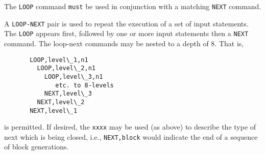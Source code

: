 \headb

The {\tt LOOP} command {\tt must} be used in conjunction
with a matching {\tt NEXT} command.

A {\tt LOOP-NEXT} pair is used to
repeat the execution of a set of input statements.  The {\tt LOOP}
appears first, followed by one or more input statements then
a {\tt NEXT} command.  The loop-next commands may be
nested to a depth of 8.  That is,
\begin{verbatim}
       LOOP,level\_1,n1
         LOOP,level\_2,n1
           LOOP,level\_3,n1
              etc. to 8-levels
           NEXT,level\_3
         NEXT,level\_2
       NEXT,level\_1
\end{verbatim}
is permitted.
If desired, the {\tt xxxx} may be used (as above)
to describe the type of next which is being closed, i.e.,
{\tt NEXT,block} would indicate the end of a sequence of block generations.

\vfill\eject
